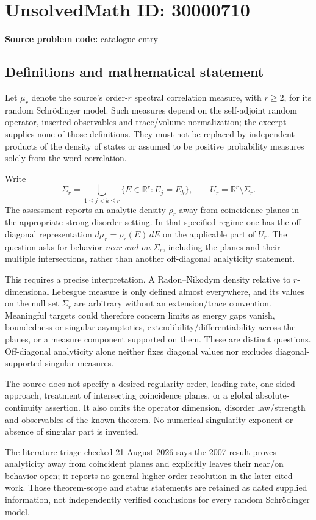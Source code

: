 \documentclass[11pt]{article}
\newcommand{\R}{\mathbb{R}}
\begin{document}
\section*{UnsolvedMath ID: 30000710}
\textbf{Source problem code:} catalogue entry
\subsection{Definitions and mathematical statement}
Let $\mu_r$ denote the source's order-$r$ spectral correlation measure, with $r\geq2$, for its random Schr\"odinger model. Such measures depend on the self-adjoint random operator, inserted observables and trace/volume normalization; the excerpt supplies none of those definitions. They must not be replaced by independent products of the density of states or assumed to be positive probability measures solely from the word correlation.

Write
\[
 \Sigma_r=\bigcup_{1\leq j<k\leq r}\{E\in\R^r:E_j=E_k\},
 \qquad U_r=\R^r\setminus\Sigma_r.
\]
The assessment reports an analytic density $\rho_r$ away from coincidence planes in the appropriate strong-disorder setting. In that specified regime one has the off-diagonal representation $d\mu_r=\rho_r(E)\,dE$ on the applicable part of $U_r$. The question asks for behavior \emph{near and on} $\Sigma_r$, including the planes and their multiple intersections, rather than another off-diagonal analyticity statement.

This requires a precise interpretation. A Radon--Nikodym density relative to $r$-dimensional Lebesgue measure is only defined almost everywhere, and its values on the null set $\Sigma_r$ are arbitrary without an extension/trace convention. Meaningful targets could therefore concern limits as energy gaps vanish, boundedness or singular asymptotics, extendibility/differentiability across the planes, or a measure component supported on them. These are distinct questions. Off-diagonal analyticity alone neither fixes diagonal values nor excludes diagonal-supported singular measures.

The source does not specify a desired regularity order, leading rate, one-sided approach, treatment of intersecting coincidence planes, or a global absolute-continuity assertion. It also omits the operator dimension, disorder law/strength and observables of the known theorem. No numerical singularity exponent or absence of singular part is invented.

The literature triage checked 21 August 2026 says the 2007 result proves analyticity away from coincident planes and explicitly leaves their near/on behavior open; it reports no general higher-order resolution in the later cited work. Those theorem-scope and status statements are retained as dated supplied information, not independently verified conclusions for every random Schr\"odinger model.
\end{document}
